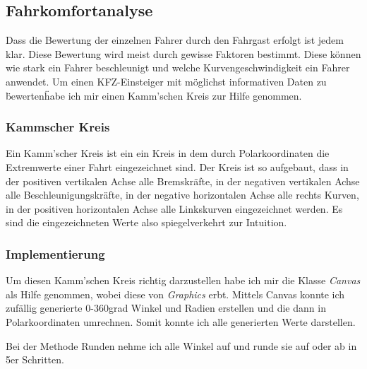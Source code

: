 \subsection{Fahrkomfortanalyse}

Dass die Bewertung der einzelnen Fahrer durch den Fahrgast erfolgt ist jedem klar.
Diese Bewertung wird meist durch gewisse Faktoren bestimmt. Diese können wie stark ein Fahrer beschleunigt und welche Kurvengeschwindigkeit ein Fahrer anwendet.
Um einen KFZ-Einsteiger mit möglichst informativen Daten zu \"bewerten\" habe ich mir einen Kamm'schen Kreis zur Hilfe genommen.

\subsubsection{Kammscher Kreis}
Ein Kamm'scher Kreis ist ein ein Kreis in dem durch Polarkoordinaten die Extremwerte einer Fahrt eingezeichnet sind.
Der Kreis ist so aufgebaut, dass in der positiven vertikalen Achse alle Bremskräfte, in der negativen vertikalen Achse alle Beschleunigungskräfte,
in der negative horizontalen Achse alle rechts Kurven, in der positiven horizontalen Achse alle Linkskurven eingezeichnet werden. 
Es sind die eingezeichneten Werte also spiegelverkehrt zur Intuition.

\subsubsection{Implementierung}
Um diesen Kamm'schen Kreis richtig darzustellen habe ich mir die Klasse \textit{Canvas} als Hilfe genommen, wobei diese von \textit{Graphics} erbt.
Mittels Canvas konnte ich zufällig generierte 0-360grad Winkel und Radien erstellen und die dann in Polarkoordinaten umrechnen.
Somit konnte ich alle generierten Werte darstellen. 



Bei der Methode Runden nehme ich alle Winkel auf und runde sie auf oder ab in 5er Schritten.



\clearpage %
